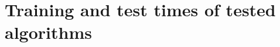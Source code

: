 \documentclass{article}
\newcommand{\Algo}[1]{\textsc{#1}}
\newcommand{\tableBefore}{-0pt}
\newcommand{\tableAfter}{-0pt}
\begin{document}
%
%
%

\section{Training and test times of tested algorithms}
\label{app:running_times}
\end{document}

